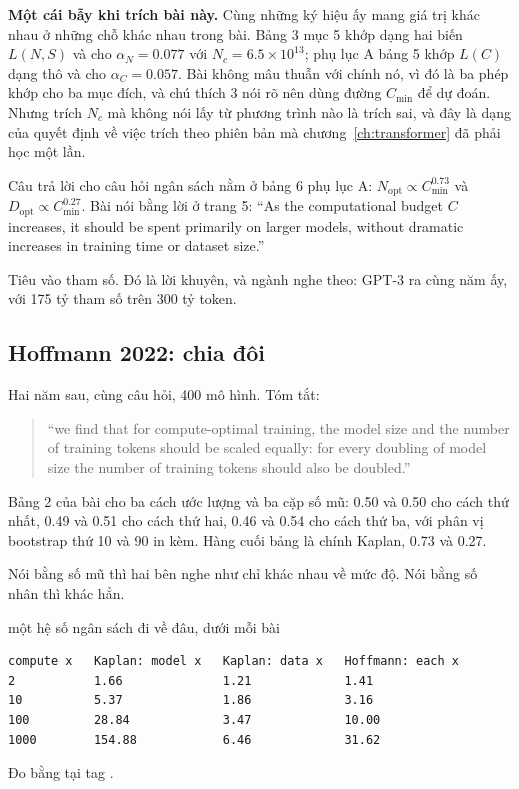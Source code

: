 \textbf{Một cái bẫy khi trích bài này.} Cùng những ký hiệu ấy mang giá trị khác
nhau ở những chỗ khác nhau trong bài. Bảng 3 mục 5 khớp dạng hai biến
\(L(N, S)\) và cho \(\alpha_N = 0.077\) với \(N_c = 6.5 \times 10^{13}\); phụ
lục A bảng 5 khớp \(L(C)\) dạng thô và cho \(\alpha_C = 0.057\). Bài không mâu
thuẫn với chính nó, vì đó là ba phép khớp cho ba mục đích, và chú thích 3 nói
rõ nên dùng đường \(C_{\min}\) để dự đoán. Nhưng trích \(N_c\) mà không nói lấy
từ phương trình nào là trích sai, và đây là dạng của quyết định về việc trích
theo phiên bản mà chương~\ref{ch:transformer} đã phải học một lần.

Câu trả lời cho câu hỏi ngân sách nằm ở bảng 6 phụ lục A: \(N_{\mathrm{opt}}
\propto C_{\min}^{0.73}\) và \(D_{\mathrm{opt}} \propto C_{\min}^{0.27}\). Bài
nói bằng lời ở trang 5: \enquote{As the computational budget \(C\) increases, it
should be spent primarily on larger models, without dramatic increases in
training time or dataset size.}

Tiêu vào tham số. Đó là lời khuyên, và ngành nghe theo: GPT-3 ra cùng năm ấy,
với 175 tỷ tham số trên 300 tỷ token.

\subsection*{Hoffmann 2022: chia đôi}

%
Hai năm sau, cùng câu hỏi, 400 mô hình. Tóm tắt:

\begin{quote}
\enquote{we find that for compute-optimal training, the model size and the
number of training tokens should be scaled equally: for every doubling of model
size the number of training tokens should also be
doubled.}~\autocite{hoffmann2022chinchilla}
\end{quote}

Bảng 2 của bài cho ba cách ước lượng và ba cặp số mũ: 0.50 và 0.50 cho cách
thứ nhất, 0.49 và 0.51 cho cách thứ hai, 0.46 và 0.54 cho cách thứ ba, với phân
vị bootstrap thứ 10 và 90 in kèm. Hàng cuối bảng là chính Kaplan, 0.73 và 0.27.

Nói bằng số mũ thì hai bên nghe như chỉ khác nhau về mức độ. Nói bằng số nhân
thì khác hẳn.

\begin{measured}{một hệ số ngân sách đi về đâu, dưới mỗi bài}
\begin{verbatim}
compute x   Kaplan: model x   Kaplan: data x   Hoffmann: each x
2           1.66              1.21             1.41
10          5.37              1.86             3.16
100         28.84             3.47             10.00
1000        154.88            6.46             31.62
\end{verbatim}

Đo bằng  tại tag .
\end{measured}

